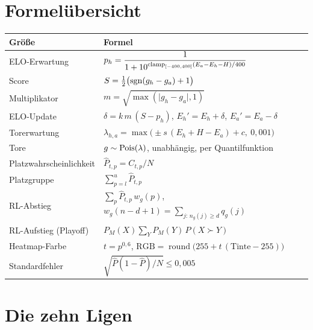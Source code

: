\chapter{Formelübersicht}

\begin{center}
\renewcommand{\arraystretch}{1.6}
\begin{tabularx}{\textwidth}{@{}>{\raggedright}p{3.4cm}X@{}}
\toprule
Größe & Formel \\
\midrule
ELO-Erwartung & $p_h = \dfrac{1}{1 + 10^{\operatorname{clamp}_{[-400,400]}(E_a - E_h - H)/400}}$ \\
Score & $S = \tfrac12\bigl(\operatorname{sgn}(g_h - g_a) + 1\bigr)$ \\
Multiplikator & $m = \sqrt{\max(\lvert g_h - g_a\rvert, 1)}$ \\
ELO-Update & $\delta = k\,m\,(S - p_h)$, \quad $E_h' = E_h + \delta$, \quad $E_a' = E_a - \delta$ \\
Torerwartung & $\lambda_{h,a} = \max\bigl(\pm s\,(E_h + H - E_a) + c,\ 0{,}001\bigr)$ \\
Tore & $g \sim \operatorname{Pois}(\lambda)$, unabhängig, per Quantilfunktion \\
Platzwahrscheinlichkeit & $\hat P_{t,p} = C_{t,p}/N$ \\
Platzgruppe & $\sum_{p=l}^{u} \hat P_{t,p}$ \\
RL-Abstieg & $\sum_p \hat P_{t,p}\, w_g(p)$, \quad $w_g(n-d+1) = \sum_{j:\,n_g(j) \ge d} q_g(j)$ \\
RL-Aufstieg (Playoff) & $P_M(X) \sum_Y P_M(Y)\, P(X \succ Y)$ \\
Heatmap-Farbe & $t = p^{0{,}6}$, \quad $\text{RGB} = \operatorname{round}\bigl(255 + t\,(\text{Tinte} - 255)\bigr)$ \\
Standardfehler & $\sqrt{\hat P(1 - \hat P)/N} \le 0{,}005$ \\
\bottomrule
\end{tabularx}
\end{center}

\chapter{Die zehn Ligen}

